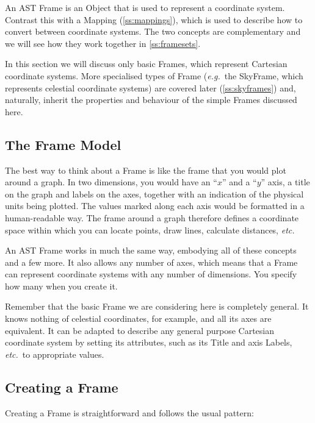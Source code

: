 \documentclass[twoside,11pt]{article}
\newcommand{\htmlref}[2]{#1}
\newcommand{\secref}[1]{\S\ref{#1}}
\renewcommand{\secref}[1]{\ref{#1}}
\begin{document}
An AST \htmlref{Frame}{Frame} is an \htmlref{Object}{Object} that is used to represent a coordinate
system. Contrast this with a \htmlref{Mapping}{Mapping} (\secref{ss:mappings}), which is
used to describe how to convert between coordinate systems. The two
concepts are complementary and we will see how they work together in
\secref{ss:framesets}.

In this section we will discuss only basic Frames, which represent
Cartesian coordinate systems. More specialised types of Frame
({\em{e.g.}}\ the \htmlref{SkyFrame}{SkyFrame}, which represents celestial coordinate
systems) are covered later (\secref{ss:skyframes}) and, naturally,
inherit the properties and behaviour of the simple Frames discussed
here.

\subsection{The Frame Model}

The best way to think about a \htmlref{Frame}{Frame} is like the frame that you would
plot around a graph. In two dimensions, you would have an ``$x$'' and
a ``$y$'' axis, a title on the graph and labels on the axes, together
with an indication of the physical units being plotted. The values
marked along each axis would be formatted in a human-readable way. The
frame around a graph therefore defines a coordinate space within which
you can locate points, draw lines, calculate distances, {\em{etc.}}

An AST Frame works in much the same way, embodying all of these
concepts and a few more. It also allows any number of axes, which
means that a Frame can represent coordinate systems with any number of
dimensions. You specify how many when you create it.

Remember that the basic Frame we are considering here is completely
general.  It knows nothing of celestial coordinates, for example, and
all its axes are equivalent. It can be adapted to describe any general
purpose Cartesian coordinate system by setting its attributes, such as
its \htmlref{Title}{Title} and axis Labels, {\em{etc.}}\ to appropriate values.

\subsection{\label{ss:creatingframes}Creating a Frame}

Creating a \htmlref{Frame}{Frame} is straightforward and follows the usual pattern:
\end{document}
